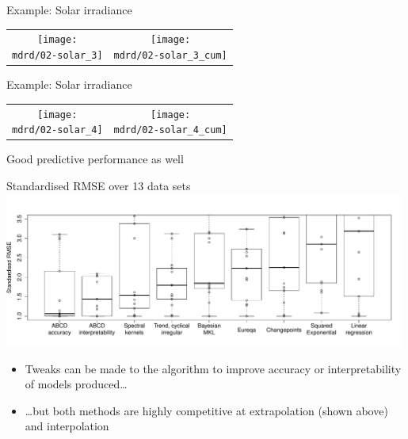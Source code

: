 \begin{frame}{Example: Solar irradiance}
\newcommand{\wmgd}{0.5\columnwidth}
\newcommand{\hmgd}{3.0cm}
\newcommand{\mdrd}{figures/02-solar}
\newcommand{\mbm}{\hspace{-0.3cm}}
{\footnotesize

}

\vspace{\baselineskip}

\begin{tabular}{cc}
\mbm \texttt{[image: \\mdrd/02-solar\_3]} & \texttt{[image: \\mdrd/02-solar\_3\_cum]}
\end{tabular}
\end{frame}

\begin{frame}{Example: Solar irradiance}
\newcommand{\wmgd}{0.5\columnwidth}
\newcommand{\hmgd}{3.0cm}
\newcommand{\mdrd}{figures/02-solar}
\newcommand{\mbm}{\hspace{-0.3cm}}
{\footnotesize

}

\vspace{\baselineskip}

\begin{tabular}{cc}
\mbm \texttt{[image: \\mdrd/02-solar\_4]} & \texttt{[image: \\mdrd/02-solar\_4\_cum]}
\end{tabular}
\end{frame}

\begin{frame}{Good predictive performance as well}
  \begin{block}{Standardised RMSE over 13 data sets}
  \includegraphics[width=0.99\textwidth]{figures/box_extrap_wide}\\
  \begin{itemize}
    \item Tweaks can be made to the algorithm to improve accuracy or interpretability of models produced\ldots
    \vspace{\baselineskip}
    \item \ldots but both methods are highly competitive at extrapolation (shown above) and interpolation
  \end{itemize}
  \end{block}
\end{frame}

